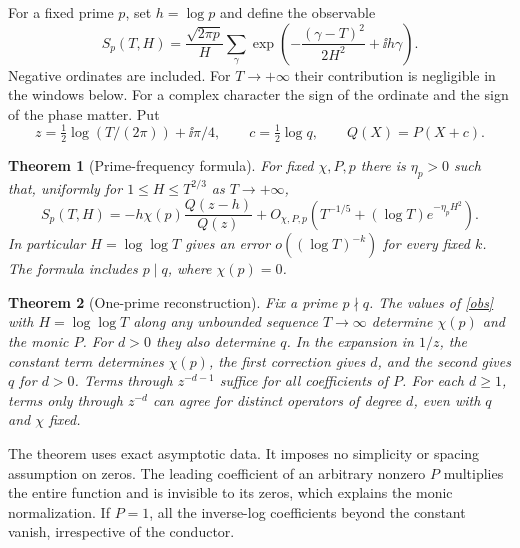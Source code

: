 \documentclass[11pt,letterpaper]{article}
\newtheorem{theorem}{Theorem}
\begin{document}
For a fixed prime $p$, set $h=\log p$ and define the observable
\begin{equation}\label{obs}
 S_p(T,H)=\frac{\sqrt{2\pi p}}{H}\sum_\gamma
      \exp\!\left(-\frac{(\gamma-T)^2}{2H^2}+\ii h\gamma\right).
\end{equation}
Negative ordinates are included. For $T\to+\infty$ their contribution
is negligible in the windows below. For a complex character the sign of the
ordinate and the sign of the phase matter. Put
\begin{equation}\label{coord}
 z=\tfrac12\log(T/(2\pi))+\ii\pi/4,\qquad
 c=\tfrac12\log q,\qquad Q(X)=P(X+c).
\end{equation}
\begin{theorem}[Prime-frequency formula]\label{th:trace}
For fixed $\chi,P,p$ there is $\eta_p>0$ such that, uniformly for
$1\le H\le T^{2/3}$ as $T\to+\infty$,
\begin{equation}\label{trace}
 S_p(T,H)=-h\chi(p)\frac{Q(z-h)}{Q(z)}
              +O_{\chi,P,p}\!\left(T^{-1/5}+ (\log T)e^{-\eta_p H^2}\right).
\end{equation}
In particular $H=\log\log T$ gives an error $o((\log T)^{-k})$ for
every fixed $k$. The formula includes $p\mid q$, where $\chi(p)=0$.
\end{theorem}
\begin{theorem}[One-prime reconstruction]\label{th:inverse}
Fix a prime $p\nmid q$. The values of \eqref{obs} with $H=\log\log T$
along any unbounded sequence $T\to\infty$ determine $\chi(p)$ and the
monic $P$. For $d>0$ they also determine $q$. In the expansion in $1/z$,
the constant term determines $\chi(p)$, the first correction gives $d$,
and the second gives $q$ for $d>0$. Terms through $z^{-d-1}$ suffice
for all coefficients of $P$. For each $d\ge1$, terms only through
$z^{-d}$ can agree for distinct operators of degree $d$, even with $q$
and $\chi$ fixed.
\end{theorem}
The theorem uses exact asymptotic data. It imposes no simplicity or
spacing assumption on zeros. The leading coefficient of an arbitrary
nonzero $P$ multiplies the entire function and is invisible to its zeros,
which explains the monic normalization. If $P=1$, all the inverse-log
coefficients beyond the constant vanish, irrespective of the conductor.
\end{document}
